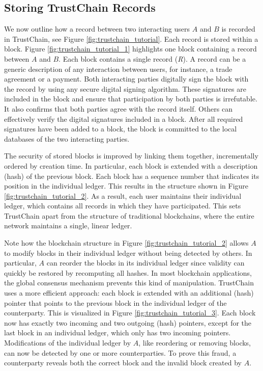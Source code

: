\subsection{Storing TrustChain Records}
We now outline how a record between two interacting users $ A $ and $ B $ is recorded in TrustChain, see Figure \ref{fig:trustchain_tutorial}.
Each record is stored within a block.
Figure \ref{fig:trustchain_tutorial_1} highlights one block containing a record between $ A $ and $ B $.
Each block contains a single record (\emph{R}).
A record can be a generic description of any interaction between users, for instance, a trade agreement or a payment.
Both interacting parties digitally sign the block with the record by using any secure digital signing algorithm.
These signatures are included in the block and ensure that participation by both parties is irrefutable.
It also confirms that both parties agree with the record itself.
Others can effectively verify the digital signatures included in a block.
After all required signatures have been added to a block, the block is committed to the local databases of the two interacting parties.

The security of stored blocks is improved by linking them together, incrementally ordered by creation time.
In particular, each block is extended with a description (hash) of the previous block.
Each block has a sequence number that indicates its position in the individual ledger.
This results in the structure shown in Figure \ref{fig:trustchain_tutorial_2}.
As a result, each user maintains their individual ledger, which contains all records in which they have participated.
This sets TrustChain apart from the structure of traditional blockchains, where the entire network maintains a single, linear ledger.

Note how the blockchain structure in Figure \ref{fig:trustchain_tutorial_2} allows $ A $ to modify blocks in their individual ledger without being detected by others.
In particular, $ A $ can reorder the blocks in its individual ledger since validity can quickly be restored by recomputing all hashes.
In most blockchain applications, the global consensus mechanism prevents this kind of manipulation.
TrustChain uses a more efficient approach: each block is extended with an additional (hash) pointer that points to the previous block in the individual ledger of the counterparty.
This is visualized in Figure \ref{fig:trustchain_tutorial_3}.
Each block now has exactly two incoming and two outgoing (hash) pointers, except for the last block in an individual ledger, which only has two incoming pointers.
Modifications of the individual ledger by $ A $, like reordering or removing blocks, can now be detected by one or more counterparties.
To prove this fraud, a counterparty reveals both the correct block and the invalid block created by $ A $.

